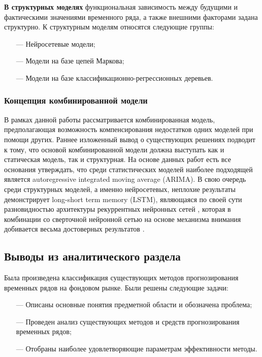 \par \textbf{В структурных моделях} функциональная зависимость между будущими и фактическими значениями временного ряда, а также внешними факторами задана структурно. К структурным моделям относятся следующие группы:

\begin{itemize}[leftmargin=1.6\parindent]
	\item[---] Нейросетевые модели;
	\item[---] Модели на базе цепей Маркова;
	\item[---] Модели на базе классификационно-регрессионных деревьев.
\end{itemize}

\subsubsection{Концепция комбинированной модели}

\par В рамках данной работы рассматривается комбинированная модель, предполагающая возможность компенсирования недостатков одних моделей при помощи других. Раннее изложенный вывод о существующих решениях подводит к тому, что основой комбинированной модели должна выступать как и статическая модель, так и структурная. На основе данных работ \cite{math-model,math-model-1,math-model-2,math-model-3} есть все основания утверждать, что среди статистических моделей наиболее подходящей является autoregressive integrated moving average (ARIMA). В свою очередь среди структурных моделей, а именно нейросетевых, неплохие результаты демонстрирует long-short term memory (LSTM), являющаяся по своей сути разновидностью архитектуры рекуррентных нейронных сетей \cite{LSTM-state,framework,ml-vakh}, которая в комбинации со сверточной нейронной сетью на основе механизма внимания добивается весьма достоверных результатов \cite{CNN-LSTM,CNN-model,combining,short-term}.

\subsection{Выводы из аналитического раздела}

\par Была произведена классификация существующих методов прогнозирования временных рядов на фондовом рынке. Были решены следующие задачи:

\begin{itemize}[leftmargin=1.6\parindent]
    \item[---] Описаны основные понятия предметной области и обозначена проблема;
	\item[---] Проведен анализ существующих методов и средств прогнозирования временных рядов;
	\item[---] Отобраны наиболее удовлетворяющие параметрам эффективности методы.
\end{itemize}

\pagebreak